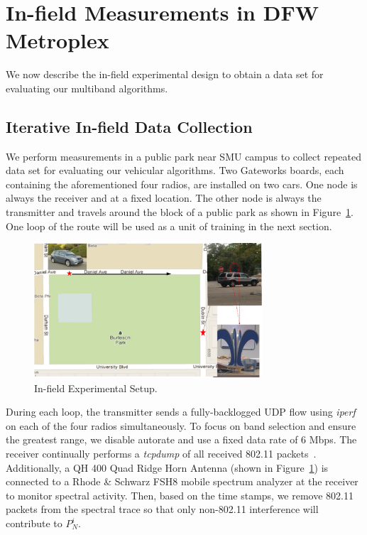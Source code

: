 \section{In-field Measurements in DFW Metroplex}

We now describe the in-field experimental design to obtain a data set for
evaluating our multiband algorithms. 


\subsection{Iterative In-field Data Collection}
\label{subsec:insitu}

We perform measurements in a public park near SMU campus to collect repeated 
data set for evaluating our vehicular algorithms.
Two Gateworks boards, each containing
the aforementioned four radios, are installed on two cars.  One node is always
the receiver and at a fixed location. The other node is always the 
transmitter and travels 
around the block of a public park as shown in Figure~\ref{fig:infield}.
One loop of the route will be used as a unit of training in the next section.

\begin{figure} [h]
\centering
\includegraphics[width=85mm]{figures/infield}
\vspace{-0.1in}
\caption{In-field Experimental Setup.}
\label{fig:infield}
\vspace{-0.1in}
\end{figure}

During each loop, the transmitter sends a fully-backlogged UDP flow
using {\it iperf} on each of the four radios simultaneously.  To
focus on band selection and ensure the greatest range, we disable autorate and use a fixed data rate
of 6 Mbps. The receiver continually performs a {\it tcpdump} of all
received 802.11 packets~\cite{jacobson1989tcpdump}. Additionally, a
QH 400 Quad Ridge Horn Antenna (shown in Figure~\ref{fig:infield}) is 
connected to a Rhode \& Schwarz FSH8 mobile spectrum analyzer at the 
receiver to monitor spectral activity. Then, based on the 
time stamps, we remove 802.11 packets from the spectral trace 
so that only non-802.11 interference will contribute to $P_N^i$.

